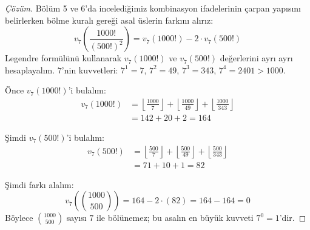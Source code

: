 \begin{proof}[Çözüm]
Bölüm 5 ve 6'da incelediğimiz kombinasyon ifadelerinin çarpan yapısını belirlerken bölme kuralı gereği asal üslerin farkını alırız:
\[ v_7\left(\frac{1000!}{(500!)^2}\right) = v_7(1000!) - 2 \cdot v_7(500!) \]
Legendre formülünü kullanarak $v_7(1000!)$ ve $v_7(500!)$ değerlerini ayrı ayrı hesaplayalım.
$7$'nin kuvvetleri: $7^1 = 7$, $7^2 = 49$, $7^3 = 343$, $7^4 = 2401 > 1000$.

Önce $v_7(1000!)$'i bulalım:
\begin{align*}
v_7(1000!) &= \left\lfloor \frac{1000}{7} \right\rfloor + \left\lfloor \frac{1000}{49} \right\rfloor + \left\lfloor \frac{1000}{343} \right\rfloor \\
           &= 142 + 20 + 2 = 164
\end{align*}

Şimdi $v_7(500!)$'i bulalım:
\begin{align*}
v_7(500!) &= \left\lfloor \frac{500}{7} \right\rfloor + \left\lfloor \frac{500}{49} \right\rfloor + \left\lfloor \frac{500}{343} \right\rfloor \\
          &= 71 + 10 + 1 = 82
\end{align*}

Şimdi farkı alalım:
\[ v_7\left(\binom{1000}{500}\right) = 164 - 2 \cdot (82) = 164 - 164 = 0 \]
Böylece $\binom{1000}{500}$ sayısı $7$ ile bölünemez; bu asalın en büyük kuvveti $7^0 = 1$'dir.
\end{proof}
